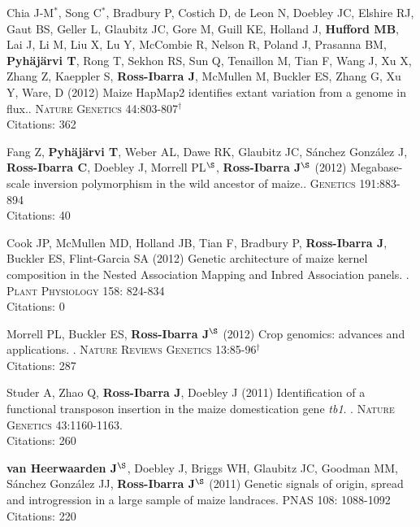 \documentclass[letterpaper,10pt]{article}
\begin{document}
\begin{etaremune}
\item  Chia J-M$^*$, Song C$^*$, Bradbury P, Costich D, de Leon N, Doebley JC, Elshire RJ, Gaut BS, Geller L, Glaubitz JC, Gore M, Guill KE, Holland J,  {\bf Hufford MB}, Lai J, Li M, Liu X, Lu Y, McCombie R, Nelson R, Poland J, Prasanna BM,  {\bf Pyh\"aj\"arvi T}, Rong T, Sekhon RS,  Sun Q, Tenaillon M, Tian F, Wang J, Xu X, Zhang Z, Kaeppler S, {\bf Ross-Ibarra J}, McMullen M, Buckler ES, Zhang G, Xu Y, Ware, D (2012) Maize HapMap2 identifies extant variation from a genome in flux.. \textsc{Nature Genetics} 44:803-807$^\dagger$
\\Citations: 362\\


\item Fang Z, {\bf Pyh\"aj\"arvi T}, Weber AL, Dawe RK, Glaubitz JC, S\'{a}nchez Gonz\'{a}lez J, {\bf Ross-Ibarra C}, Doebley J, Morrell PL$^\S$, {\bf Ross-Ibarra J}$^\S$  (2012) Megabase-scale inversion polymorphism in the wild ancestor of maize.. \textsc{Genetics} 191:883-894
\\Citations: 40\\


\item Cook JP, McMullen MD, Holland JB, Tian F, Bradbury P, {\bf Ross-Ibarra J}, Buckler ES, Flint-Garcia SA (2012) Genetic architecture of maize kernel composition in the Nested Association Mapping and Inbred Association panels. . \textsc{Plant Physiology} 158: 824-834
\\Citations: 0\\

\item Morrell PL, Buckler ES, {\bf Ross-Ibarra J}$^\S$ (2012) Crop genomics: advances and applications. . \textsc{Nature Reviews Genetics} 13:85-96$^\dagger$
\\Citations: 287\\


\item Studer A, Zhao Q, {\bf Ross-Ibarra J}, Doebley J (2011) Identification of a functional transposon insertion in the maize domestication gene \emph{tb1}. . \textsc{Nature Genetics} 43:1160-1163.
\\Citations: 260\\


\item {\bf van Heerwaarden J}$^\S$, Doebley J, Briggs WH, Glaubitz JC, Goodman MM, S\'{a}nchez Gonz\'{a}lez JJ, {\bf Ross-Ibarra J}$^\S$ (2011) Genetic signals of origin, spread and introgression in a large sample of maize landraces. PNAS 108: 1088-1092
\\Citations: 220\\



\end{etaremune}
\end{document}
